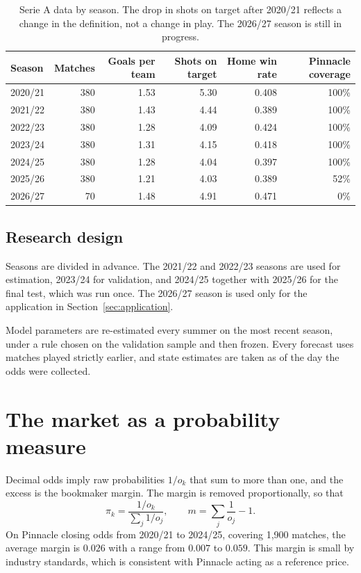 \documentclass[11pt,a4paper]{article}
\begin{document}
\begin{table}[H]
\centering\small
\begin{tabular}{lrrrrr}
\toprule
Season & Matches & Goals per team & Shots on target & Home win rate & Pinnacle coverage \\
\midrule
2020/21 & 380 & 1.53 & 5.30 & 0.408 & 100\% \\
2021/22 & 380 & 1.43 & 4.44 & 0.389 & 100\% \\
2022/23 & 380 & 1.28 & 4.09 & 0.424 & 100\% \\
2023/24 & 380 & 1.31 & 4.15 & 0.418 & 100\% \\
2024/25 & 380 & 1.28 & 4.04 & 0.397 & 100\% \\
2025/26 & 380 & 1.21 & 4.03 & 0.389 & 52\% \\
2026/27 & 70 & 1.48 & 4.91 & 0.471 & 0\% \\
\bottomrule
\end{tabular}
\caption{Serie A data by season. The drop in shots on target after 2020/21 reflects a change in the
definition, not a change in play. The 2026/27 season is still in progress.}
\label{tab:data}
\end{table}

\subsection{Research design}
Seasons are divided in advance. The 2021/22 and 2022/23 seasons are used for estimation, 2023/24 for
validation, and 2024/25 together with 2025/26 for the final test, which was run once. The 2026/27
season is used only for the application in Section~\ref{sec:application}.

Model parameters are re-estimated every summer on the most recent season, under a rule chosen on the
validation sample and then frozen. Every forecast uses matches played strictly earlier, and state
estimates are taken as of the day the odds were collected.

\section{The market as a probability measure}
Decimal odds imply raw probabilities $1/o_k$ that sum to more than one, and the excess is the
bookmaker margin. The margin is removed proportionally, so that
\begin{equation}
\pi_k = \frac{1/o_k}{\sum_j 1/o_j}, \qquad m = \sum_j \frac{1}{o_j} - 1 .
\end{equation}
On Pinnacle closing odds from 2020/21 to 2024/25, covering 1{,}900 matches, the average margin is
$0.026$ with a range from $0.007$ to $0.059$. This margin is small by industry standards, which is
consistent with Pinnacle acting as a reference price.
\end{document}

